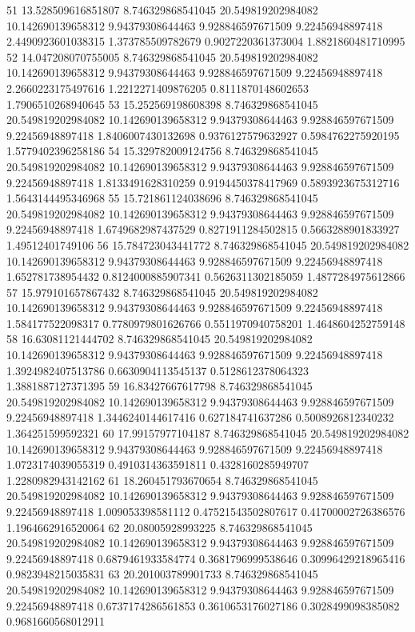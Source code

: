 {51 13.528509616851807 8.746329868541045 20.549819202984082 10.142690139658312 9.94379308644463 9.928846597671509 9.22456948897418 2.4490923601038315 1.373785509782679 0.9027220361373004 1.8821860481710995
52 14.047208070755005 8.746329868541045 20.549819202984082 10.142690139658312 9.94379308644463 9.928846597671509 9.22456948897418 2.2660223175497616 1.2212271409876205 0.8111870148602653 1.7906510268940645
53 15.252569198608398 8.746329868541045 20.549819202984082 10.142690139658312 9.94379308644463 9.928846597671509 9.22456948897418 1.8406007430132698 0.9376127579632927 0.5984762275920195 1.5779402396258186
54 15.329782009124756 8.746329868541045 20.549819202984082 10.142690139658312 9.94379308644463 9.928846597671509 9.22456948897418 1.8133491628310259 0.9194450378417969 0.5893923675312716 1.5643144495346968
55 15.721861124038696 8.746329868541045 20.549819202984082 10.142690139658312 9.94379308644463 9.928846597671509 9.22456948897418 1.6749682987437529 0.8271911284502815 0.5663288901833927 1.49512401749106
56 15.784723043441772 8.746329868541045 20.549819202984082 10.142690139658312 9.94379308644463 9.928846597671509 9.22456948897418 1.652781738954432 0.8124000885907341 0.5626311302185059 1.4877284975612866
57 15.979101657867432 8.746329868541045 20.549819202984082 10.142690139658312 9.94379308644463 9.928846597671509 9.22456948897418 1.584177522098317 0.7780979801626766 0.5511970940758201 1.4648604252759148
58 16.63081121444702 8.746329868541045 20.549819202984082 10.142690139658312 9.94379308644463 9.928846597671509 9.22456948897418 1.3924982407513786 0.6630904113545137 0.5128612378064323 1.3881887127371395
59 16.83427667617798 8.746329868541045 20.549819202984082 10.142690139658312 9.94379308644463 9.928846597671509 9.22456948897418 1.3446240144617416 0.627184741637286 0.5008926812340232 1.364251599592321
60 17.99157977104187 8.746329868541045 20.549819202984082 10.142690139658312 9.94379308644463 9.928846597671509 9.22456948897418 1.0723174039055319 0.4910314363591811 0.4328160285949707 1.2280982943142162
61 18.260451793670654 8.746329868541045 20.549819202984082 10.142690139658312 9.94379308644463 9.928846597671509 9.22456948897418 1.009053398581112 0.47521543502807617 0.41700002726386576 1.1964662916520064
62 20.08005928993225 8.746329868541045 20.549819202984082 10.142690139658312 9.94379308644463 9.928846597671509 9.22456948897418 0.6879461933584774 0.3681796999538646 0.30996429218965416 0.9823948215035831
63 20.201003789901733 8.746329868541045 20.549819202984082 10.142690139658312 9.94379308644463 9.928846597671509 9.22456948897418 0.6737174286561853 0.3610653176027186 0.3028499098385082 0.9681660568012911
}
